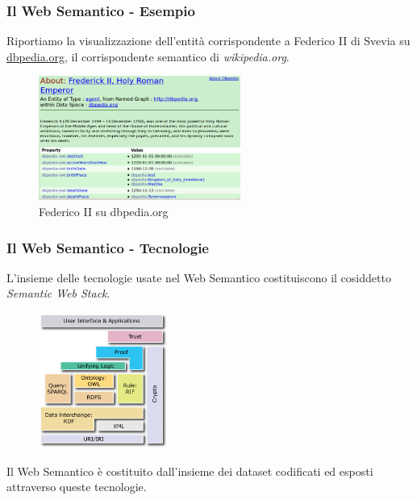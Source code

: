 \documentclass[8pt]{beamer}
\begin{document}
\begin{frame}
 \frametitle{Il Web Semantico - Esempio}
 Riportiamo la visualizzazione dell'entit\`a corrispondente a
 Federico II di Svevia su \url{dbpedia.org}, il corrispondente semantico
 di \emph{wikipedia.org}.

   \begin{figure}
      \includegraphics[width=250px]{federicoII_dbpedia.png} 
      \caption{Federico II su dbpedia.org}
  \end{figure}
\end{frame}

\begin{frame}
 \frametitle{Il Web Semantico - Tecnologie}
 
 L'insieme delle tecnologie usate nel Web Semantico costituiscono il 
 cosiddetto \emph{Semantic Web Stack}.
 
 \begin{figure}
   \includegraphics[width=160px]{Semantic_Web_Stack.png} 
 \end{figure}

 Il Web Semantico \`e costituito dall'insieme dei dataset 
 codificati ed esposti attraverso queste tecnologie.
\end{frame}
\end{document}
